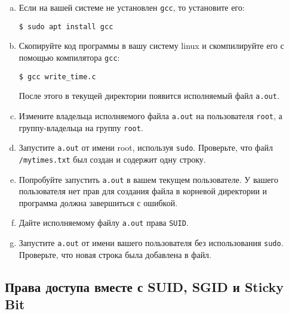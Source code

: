 \documentclass{article}
\begin{document}
\begin{enumerate}[(a)]
\item Если на вашей системе не установлен \texttt{gcc}, то установите его:
\begin{lstlisting}
$ sudo apt install gcc
\end{lstlisting}

\item Скопируйте код программы в вашу систему linux и скомпилируйте его с помощью компилятора \texttt{gcc}:
\begin{lstlisting}
$ gcc write_time.c
\end{lstlisting}
После этого в текущей директории появится исполняемый файл \texttt{a.out}.

\item Измените владельца исполняемого файла \texttt{a.out} на пользователя \texttt{root}, а группу-владельца на группу \texttt{root}. 
\item Запустите \texttt{a.out} от имени root, используя \texttt{sudo}. Проверьте, что файл \texttt{/mytimes.txt} был создан и содержит одну строку.
\item Попробуйте запустить \texttt{a.out} в вашем текущем пользователе. У вашего пользователя нет прав для создания файла в корневой директории и программа должна завершиться с ошибкой.
\item Дайте исполняемому файлу \texttt{a.out} права \texttt{SUID}.
\item Запустите \texttt{a.out} от имени вашего пользователя без использования \texttt{sudo}. Проверьте, что новая строка была добавлена в файл.
\end{enumerate}


\subsection{Права доступа вместе с SUID, SGID и Sticky Bit}
\end{document}
